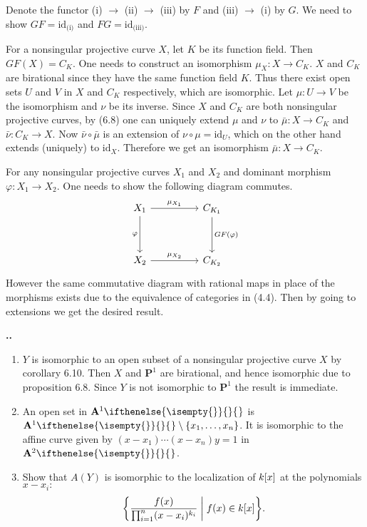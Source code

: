\documentclass{note}
\makeatletter
\newcounter{exercise}[section]
\newcommand\Ex{
    \if@noskipsec \leavevmode \fi
    \par
    \refstepcounter{exercise}
    \textbf{\thesection.\arabic{exercise}.}
}
\newcommand{\Affine}[2][]{\mathbf{A}^{#2}\ifthenelse{\isempty{#1}}{}{_{#1}}}
\newcommand{\Proj}[1]{\mathbf{P}^{#1}}
\newcommand{\id}{\mathrm{id}}
\makeatother
\begin{document}


Denote the functor (i) $\to$ (ii) $\to$ (iii) by $F$ and (iii) $\to$ (i) by
$G$. We need to show $GF=\id_{\text{(i)}}$ and $FG=\id_{\text{(iii)}}$.

For a nonsingular projective curve $X$, let $K$ be its function field. Then
$GF(X) = C_K$. One needs to construct an isomorphism $\mu_X\colon X\to C_K$.
$X$ and $C_K$ are birational since they have the same function field $K$. Thus
there exist open sets $U$ and $V$ in $X$ and $C_K$ respectively, which are
isomorphic. Let $\mu\colon U\to V$ be the isomorphism and $\nu$ be its inverse.
Since $X$ and $C_K$ are both nonsingular projective curves, by (6.8) one can
uniquely extend $\mu$ and $\nu$ to $\bar\mu\colon X\to C_K$ and $\bar\nu\colon
  C_K\to X$. Now $\bar\nu\circ\bar\mu$ is an extension of $\nu\circ\mu = \id_U$,
which on the other hand extends (uniquely) to $\id_X$. Therefore we get an
isomorphism $\bar\mu\colon X\to C_K$.

For any nonsingular projective curves $X_1$ and $X_2$ and dominant morphism
$\varphi\colon X_1\to X_2$. One needs to show the following diagram commutes.
\begin{equation*}
  \begin{tikzcd}[row sep=huge,column sep=huge]
    X_1 \arrow{r}{\mu_{X_1}} \arrow[swap]{d}{\varphi} & C_{K_1}
    \arrow{d}{GF(\varphi)} \\ X_2 \arrow{r}{\mu_{X_2}} & C_{K_2}
  \end{tikzcd}
\end{equation*}
However the same commutative diagram with rational maps in place of the
morphisms exists due to the equivalence of categories in (4.4). Then by going
to extensions we get the desired result.


\Ex
\begin{enumerate}
  \item $Y$ is isomorphic to an open subset of a nonsingular projective
        curve $X$ by corollary 6.10. Then $X$ and $\Proj1$ are birational, and hence
        isomorphic due to proposition 6.8. Since $Y$ is not isomorphic to $\Proj1$ the
        result is immediate.
  \item An open set in $\Affine1$ is $\Affine1\setminus\set{x_1}{\dots}{x_n}$. It is
        isomorphic to the affine curve given by $(x-x_1)\cdots(x-x_n)y=1$ in
        $\Affine2$.
  \item Show that $A(Y)$ is isomorphic to the localization of $\polynomials{k}{x}$ at
        the polynomials $x-x_i\colon$
        \begin{equation*}
          \set{\frac{f(x)}{\prod_{i=1}^n(x-x_i)^{k_i}} \biggm\vert f(x) \in
            \polynomials{k}{x}}.
        \end{equation*}
\end{enumerate}
\end{document}
